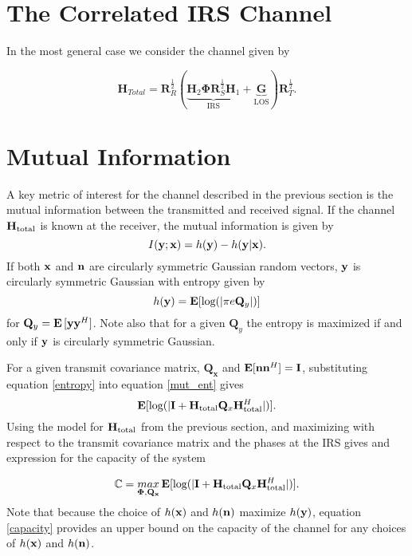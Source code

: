 \documentclass[12pt,a4paper]{report}
\begin{document}
\section{The Correlated IRS Channel}
In the most general case we consider the channel given by 

	\begin{equation}
	\mathbf{H}_{Total} = \mathbf{R}_{R}^{\frac{1}{2}}(\underbrace{\mathbf{H}_{2}\boldsymbol{\Phi}\mathbf{R}_{S}^{\frac{1}{2}}\mathbf{H}_{1}}_{\text{IRS}} + \underbrace{\mathbf{G}}_{\text{LOS}})\mathbf{R}_{T}^{\frac{1}{2}}.
	\end{equation}

\section{Mutual Information}\label{sectiond:mut_info}
A key metric of interest for the channel described in the previous section is the mutual information between the transmitted and received signal. If the channel $\mathbf{H}_\text{total}$ is known at the receiver, the mutual information is given by 
\begin{equation}\label{mut_ent}
I(\mathbf{y};\mathbf{x}) = h(\mathbf{y}) - h(\mathbf{y}|\mathbf{x}).
\end{equation}
If both $\mathbf{x}$ and $\mathbf{n}$ are circularly symmetric Gaussian random vectors, $\mathbf{y}$ is circularly symmetric Gaussian with entropy given by \cite{telatar1999capacity} 
\begin{equation}\label{entropy}
h(\mathbf{y}) = \mathop{\bf E{}}[\text{log{}}(|\pi e \mathbf{Q}_{y}|)]
\end{equation}
 for $\mathbf{Q}_{y} = \mathop{\bf E{}}{[\mathbf{y} \mathbf{y}^H]}$. Note also that for a given $\mathbf{Q}_{y}$ the entropy is maximized if and only if $\mathbf{y}$ is circularly symmetric Gaussian.

For a given transmit covariance matrix, $\mathbf{Q_x}$ and $\mathop{\bf E{}}[\mathbf{n}\mathbf{n}^H] = \mathbf{I}$, substituting equation \eqref{entropy} into equation
\eqref{mut_ent} gives
\begin{equation}\label{mut_inf}
\mathop{\bf E{}} [\text{log{}}(|\mathbf{I} + \mathbf{H}_\text{total} \mathbf{Q}_x \mathbf{H}_\text{total}^H|)].
\end{equation}
Using the model for $\mathbf{H}_\text{total}$ from the previous section, and maximizing with respect to the
transmit covariance matrix and the phases at the IRS gives and expression for the capacity of the system

\begin{equation}\label{capacity}
\mathbb{C} = \underset{\boldsymbol{\Phi},\mathbf{Q_x}}{\mathop{max}} \mathop{\bf E{}} [\text{log{}}(|\mathbf{I} + \mathbf{H}_\text{total} \mathbf{Q}_x \mathbf{H}_\text{total}^H|)].
\end{equation}
Note that because the choice of $h(\mathbf{x}) $ and $h(\mathbf{n})$ maximize $h(\mathbf{y})$, equation \eqref{capacity} provides an upper bound on the capacity of the channel for any choices of $h(\mathbf{x}) $ and $h(\mathbf{n})$.
\end{document}
